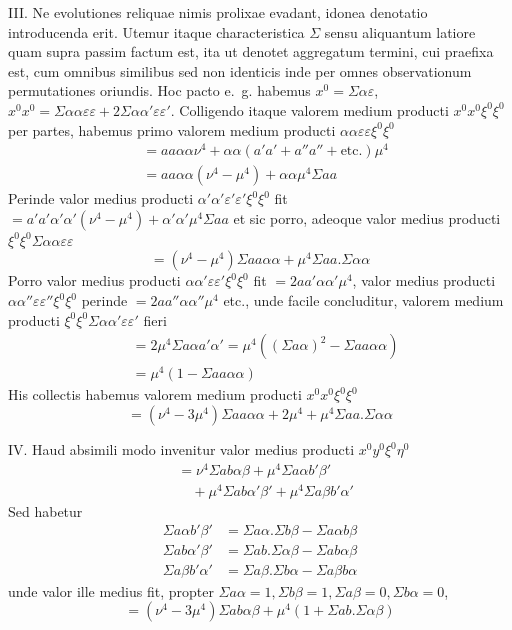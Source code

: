 III. Ne evolutiones reliquae nimis prolixae evadant, idonea denotatio introducenda erit. Utemur itaque characteristica \(\Sigma\) sensu aliquantum latiore quam supra passim factum est, ita ut denotet aggregatum termini, cui praefixa est, cum omnibus similibus sed non identicis inde per omnes observationum permutationes oriundis. Hoc pacto e.\ g. habemus \(x^0=\Sigma\alpha\varepsilon\), \(x^0x^0=\Sigma\alpha\alpha\varepsilon\varepsilon+2\Sigma\alpha\alpha'\varepsilon\varepsilon'\). Colligendo itaque valorem medium producti \(x^0x^0\xi^0\xi^0\) per partes, habemus primo valorem medium producti \(\alpha\alpha\varepsilon\varepsilon\xi^0\xi^0\)
\[
\begin{aligned}
&=aa\alpha\alpha\nu^4+\alpha\alpha(a'a'+a''a''+\text{etc.})\mu^4\\
&=aa\alpha\alpha(\nu^4-\mu^4)+\alpha\alpha\mu^4\Sigma aa
\end{aligned}
\]
Perinde valor medius producti \(\alpha'\alpha'\varepsilon'\varepsilon'\xi^0\xi^0\) fit \(=a'a'\alpha'\alpha'(\nu^4-\mu^4)+\alpha'\alpha'\mu^4\Sigma aa\) et sic porro, adeoque valor medius producti \(\xi^0\xi^0\Sigma\alpha\alpha\varepsilon\varepsilon\)
\[
=(\nu^4-\mu^4)\Sigma aa\alpha\alpha+\mu^4\Sigma aa.\Sigma\alpha\alpha
\]
Porro valor medius producti \(\alpha\alpha'\varepsilon\varepsilon'\xi^0\xi^0\) fit \(=2aa'\alpha\alpha'\mu^4\), valor medius producti \(\alpha\alpha''\varepsilon\varepsilon''\xi^0\xi^0\) perinde \(=2aa''\alpha\alpha''\mu^4\) etc., unde facile concluditur, valorem medium producti \(\xi^0\xi^0\Sigma\alpha\alpha'\varepsilon\varepsilon'\) fieri
\[
\begin{aligned}
&=2\mu^4\Sigma a\alpha a'\alpha'=\mu^4((\Sigma a\alpha)^2-\Sigma aa\alpha\alpha)\\
&=\mu^4(1-\Sigma aa\alpha\alpha)
\end{aligned}
\]
His collectis habemus valorem medium producti \(x^0x^0\xi^0\xi^0\)
\[
=(\nu^4-3\mu^4)\Sigma aa\alpha\alpha+2\mu^4+\mu^4\Sigma aa.\Sigma\alpha\alpha
\]

IV. Haud absimili modo invenitur valor medius producti \(x^0y^0\xi^0\eta^0\)
\[
\begin{aligned}
&=\nu^4\Sigma ab\alpha\beta+\mu^4\Sigma a\alpha b'\beta'\\
&\quad+\mu^4\Sigma ab\alpha'\beta'+\mu^4\Sigma a\beta b'\alpha'
\end{aligned}
\]
Sed habetur
\[
\begin{aligned}
\Sigma a\alpha b'\beta'&=\Sigma a\alpha.\Sigma b\beta-\Sigma a\alpha b\beta\\
\Sigma ab\alpha'\beta'&=\Sigma ab.\Sigma\alpha\beta-\Sigma ab\alpha\beta\\
\Sigma a\beta b'\alpha'&=\Sigma a\beta.\Sigma b\alpha-\Sigma a\beta b\alpha
\end{aligned}
\]
unde valor ille medius fit, propter \(\Sigma a\alpha=1,\allowbreak\Sigma b\beta=1,\allowbreak\Sigma a\beta=0,\allowbreak\Sigma b\alpha=0\),
\[
=(\nu^4-3\mu^4)\Sigma ab\alpha\beta+\mu^4(1+\Sigma ab.\Sigma\alpha\beta)
\]

